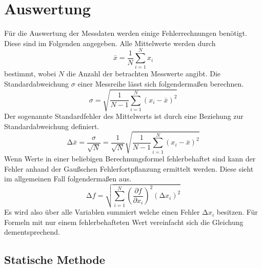 \section{Auswertung}
Für die Auswertung der Messdaten werden einige Fehlerrechnungen benötigt. Diese sind im Folgenden angegeben.
Alle Mittelwerte werden durch
\begin{equation}
\bar{x} = \frac{1}{N} \sum_{i=1}^{N} x_{i}
\end{equation}
bestimmt, wobei $N$ die Anzahl der betrachten Messwerte angibt. Die Standardabweichung $\sigma$ einer Messreihe lässt sich folgendermaßen berechnen.
\begin{equation}
\sigma = \sqrt{\frac{1}{N-1}\sum_{i=1}^{N} (x_{i} -\bar{x})^2 }
\end{equation}
Der sogenannte Standardfehler des Mittelwerts ist durch eine Beziehung zur Standardabweichung definiert.
\begin{equation}
\increment \bar{x} = \frac{\sigma}{\sqrt{N}} = \frac{1}{\sqrt{N}} \sqrt{\frac{1}{N-1}\sum_{i=1}^{N} (x_{i} -\bar{x})^2 }
\end{equation}
Wenn Werte in einer beliebigen Berechnungsformel fehlerbehaftet sind kann der Fehler anhand der Gaußschen Fehlerfortpflanzung ermittelt werden. Diese sieht im allgemeinen Fall folgendermaßen aus.
\begin{equation}
\increment f = \sqrt{\sum_{i=1}^{N} \left( \frac{\partial f}{\partial x_{i}}\right)^2 (\increment x_{i})^2}
\end{equation}
Es wird also über alle Variablen summiert welche einen Fehler $\increment x_{i}$ besitzen. Für Formeln mit nur einem fehlerbehafteten Wert vereinfacht sich die Gleichung dementsprechend.

\subsection{Statische Methode}
